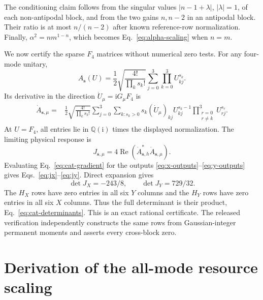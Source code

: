 \documentclass[aps,pra,reprint,amsmath,amssymb,superscriptaddress,longbibliography]{revtex4-2}
\newcommand{\ii}{\mathrm{i}}
\begin{document}
The conditioning claim follows from the singular values
$|n-1+\lambda|$, $|\lambda|=1$, of each non-antipodal block, and from the
two gains $n,n-2$ in an antipodal block.  Their ratio is at most
$n/(n-2)$ after known reference-row normalization.  Finally,
$\alpha^2=n m^{1-n}$, which becomes Eq.~\eqref{eq:alpha-scaling} when
$n=m$.

We now certify the sparse $F_4$ matrices without numerical zero tests.  For any
four-mode unitary,
\begin{equation}
 A_{\bm s}(U)
 =\frac12\sqrt{\frac{4!}{\prod_ks_k!}}
 \sum_{j=0}^{3}\prod_{k=0}^{3}U_{kj}^{s_k}.
\end{equation}
Its derivative in the direction $\dot U_\mu=\ii G_\mu F_4$ is
\begin{align}
 \dot A_{\bm s,\mu}
 ={}&\frac12\sqrt{\frac{4!}{\prod_ks_k!}}
 \sum_{j=0}^{3}\sum_{k:s_k>0}
 s_k(\dot U_\mu)_{kj}U_{kj}^{s_k-1}
 \prod_{\substack{r=0\\r\neq k}}^3U_{rj}^{s_r}.
\label{eq:cat-gradient}
\end{align}
At $U=F_4$, all entries lie in $\mathbb Q(\ii)$ times the displayed
normalization.  The limiting physical response is
\begin{equation}
 J_{\bm s,\mu}
 =4\operatorname{Re}
 \left(\dot A_{\bm s,h}^*\dot A_{\bm s,\mu}\right).
\label{eq:cat-response-entry}
\end{equation}
Evaluating Eq.~\eqref{eq:cat-gradient} for the outputs
\eqref{eq:x-outputs}--\eqref{eq:y-outputs} gives
Eqs.~\eqref{eq:jx}--\eqref{eq:jy}.  Direct expansion gives
\begin{equation}
 \det J_X=-243/8,\qquad \det J_Y=729/32.
\end{equation}
The $H_X$ rows have zero entries in all six $Y$ columns and the $H_Y$
rows have zero entries in all six $X$ columns.  Thus the full determinant
is their product, Eq.~\eqref{eq:cat-determinants}.  This is an exact
rational certificate.  The released verification independently constructs
the same rows from Gaussian-integer permanent moments and asserts every
cross-block zero.

\section{Derivation of the all-mode resource scaling}
\label{app:resource-scaling}
\end{document}
